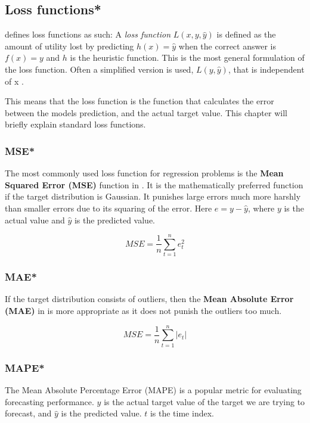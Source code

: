 \subsection{Loss functions*}
\label{section:BT:Loss}
\citeauthor{Russel2012}  defines loss functions as such:
A \textit{loss function} $L(x, y, \hat{y})$ is defined as the amount of utility lost by predicting
$h(x)=\hat{y}$ when the correct answer is $f(x) = y$ and $h$ is the heuristic function.
This is the most general formulation of the loss function. Often a simplified version is used,
$L(y, \hat{y})$, that is independent of x \cite[p. 710-711]{Russel2012}.

This means that the loss function is the function that calculates the error between the
models prediction, and the actual target value.
This chapter will briefly explain standard loss functions.


\subsubsection{MSE*}
The most commonly used loss function for regression problems is the
\textbf{Mean Squared Error (MSE)} function in .
It is the mathematically preferred function if the target distribution is Gaussian.
It punishes large errors much more harshly than smaller errors due to its squaring of the error.
Here $e = y - \hat{y}$, where $y$ is the actual value and $\hat{y}$ is the predicted value.

\begin{equation}
  \label{eq:mean-squared-error}
  MSE = \frac{1}{n} \sum_{t=1}^n e_t^2
\end{equation}

\subsubsection{MAE*}
If the target distribution consists of outliers, then the
\textbf{Mean Absolute Error (MAE)} in  is more appropriate
as it does not punish the outliers too much.

\begin{equation}
  \label{eq:mean-absolute-error}
  MSE = \frac{1}{n} \sum_{t=1}^n |e_t|
\end{equation}

\subsubsection{MAPE*}
The Mean Absolute Percentage Error  (MAPE) is a popular metric for evaluating forecasting performance.
$y$ is the actual target value of the target we are trying to forecast, and $\hat{y}$ is the predicted value.
$t$ is the time index.

